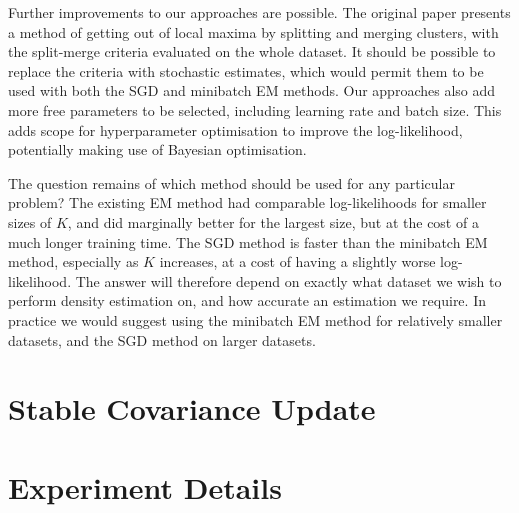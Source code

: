 \documentclass{article}
\begin{document}
Further improvements to our approaches are possible.
The original paper presents a method of getting out of local maxima by splitting and merging clusters, with the split-merge criteria evaluated on the whole dataset.
It should be possible to replace the criteria with stochastic estimates, which would permit them to be used with both the SGD and minibatch EM methods.
Our approaches also add more free parameters to be selected, including learning rate and batch size.
This adds scope for hyperparameter optimisation to improve the log-likelihood, potentially making use of Bayesian optimisation.

The question remains of which method should be used for any particular problem?
The existing EM method had comparable log-likelihoods for smaller sizes of $K$, and did marginally better for the largest size, but at the cost of a much longer training time.
The SGD method is faster than the minibatch EM method, especially as $K$ increases, at a cost of having a slightly worse log-likelihood.
The answer will therefore depend on exactly what dataset we wish to perform density estimation on, and how accurate an estimation we require.
In practice we would suggest using the minibatch EM method for relatively smaller datasets, and the SGD method on larger datasets.



\appendix

\section{Stable Covariance Update}
\label{apx:variance-rewrite}


\section{Experiment Details}
\end{document}
